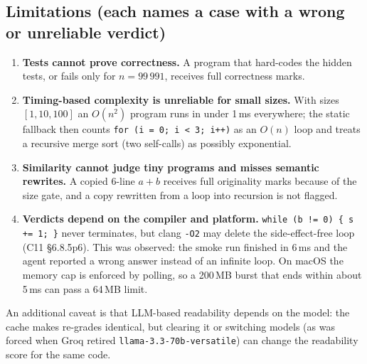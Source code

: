 \documentclass[11pt,a4paper]{article}
\begin{document}
\subsection{Limitations (each names a case with a wrong or unreliable verdict)}
\begin{enumerate}
  \item \textbf{Tests cannot prove correctness.} A program that hard-codes the hidden tests, or fails only for
        $n = 99\,991$, receives full correctness marks.
  \item \textbf{Timing-based complexity is unreliable for small sizes.} With sizes $[1, 10, 100]$ an $O(n^2)$ program runs in
        under 1\,ms everywhere; the static fallback then counts \texttt{for (i = 0; i < 3; i++)} as an $O(n)$ loop and
        treats a recursive merge sort (two self-calls) as possibly exponential.
  \item \textbf{Similarity cannot judge tiny programs and misses semantic rewrites.} A copied 6-line $a+b$ receives full
        originality marks because of the size gate, and a copy rewritten from a loop into recursion is not flagged.
  \item \textbf{Verdicts depend on the compiler and platform.} \texttt{while (b != 0) \{ s += 1; \}} never terminates, but clang
        \texttt{-O2} may delete the side-effect-free loop (C11 \S6.8.5p6). This was observed: the smoke run finished in 6\,ms
        and the agent reported a wrong answer instead of an infinite loop. On macOS the memory cap is enforced by polling,
        so a 200\,MB burst that ends within about 5\,ms can pass a 64\,MB limit.
\end{enumerate}
An additional caveat is that LLM-based readability depends on the model: the cache makes re-grades identical, but
clearing it or switching models (as was forced when Groq retired \texttt{llama-3.3-70b-versatile}) can change the
readability score for the same code.

\end{document}
